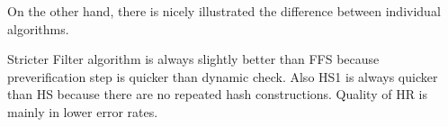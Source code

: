 On the other hand, there is nicely illustrated the difference between individual algorithms. 

Stricter Filter algorithm is always slightly better than FFS because preverification step is quicker than dynamic check. Also HS1 is always quicker than HS because there are no repeated hash constructions. Quality of HR is mainly in lower error rates.

\begin{figure}
\begin{minipage}{.5\linewidth}
\centering
{}
\end{minipage}%
\begin{minipage}{.5\linewidth}
\centering
{}
\end{minipage}\par\medskip


\end{figure}
